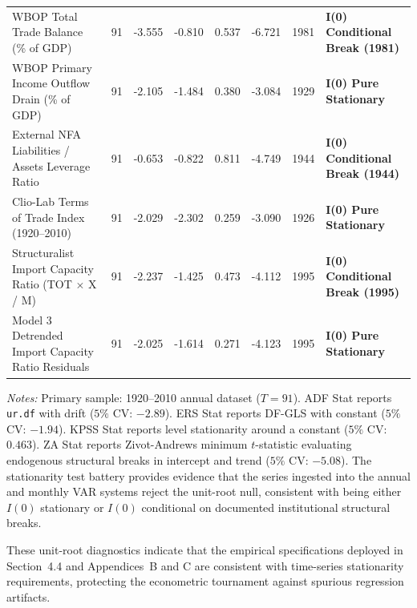 \begin{landscape}
\begin{table}[p]
\begin{tabular}{l c c c c c c l}
WBOP Total Trade Balance (\% of GDP) & 91 & -3.555 & -0.810 & 0.537 & -6.721 & 1981 & \textbf{I(0) Conditional Break (1981)} \\
WBOP Primary Income Outflow Drain (\% of GDP) & 91 & -2.105 & -1.484 & 0.380 & -3.084 & 1929 & \textbf{I(0) Pure Stationary} \\
External NFA Liabilities / Assets Leverage Ratio & 91 & -0.653 & -0.822 & 0.811 & -4.749 & 1944 & \textbf{I(0) Conditional Break (1944)} \\
Clio-Lab Terms of Trade Index (1920--2010) & 91 & -2.029 & -2.302 & 0.259 & -3.090 & 1926 & \textbf{I(0) Pure Stationary} \\
Structuralist Import Capacity Ratio (TOT $\times$ X / M) & 91 & -2.237 & -1.425 & 0.473 & -4.112 & 1995 & \textbf{I(0) Conditional Break (1995)} \\
Model 3 Detrended Import Capacity Ratio Residuals & 91 & -2.025 & -1.614 & 0.271 & -4.123 & 1995 & \textbf{I(0) Pure Stationary} \\
\bottomrule
\end{tabular}
\begin{minipage}{0.95\linewidth}
\vspace{0.4em}
\footnotesize
\textit{Notes:} Primary sample: 1920--2010 annual dataset ($T=91$). ADF Stat reports \texttt{ur.df} with drift ($5\%$ CV: $-2.89$). ERS Stat reports DF-GLS with constant ($5\%$ CV: $-1.94$). KPSS Stat reports level stationarity around a constant ($5\%$ CV: $0.463$). ZA Stat reports Zivot-Andrews minimum $t$-statistic evaluating endogenous structural breaks in intercept and trend ($5\%$ CV: $-5.08$). The stationarity test battery provides evidence that the series ingested into the annual and monthly VAR systems reject the unit-root null, consistent with being either $I(0)$ stationary or $I(0)$ conditional on documented institutional structural breaks.
\end{minipage}
\end{table}
\end{landscape}

These unit-root diagnostics indicate that the empirical specifications deployed in Section~4.4 and Appendices~B and C are consistent with time-series stationarity requirements, protecting the econometric tournament against spurious regression artifacts.
